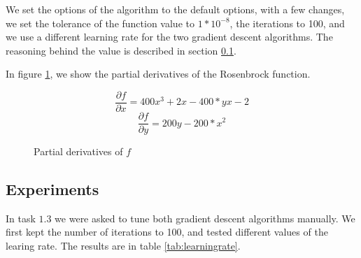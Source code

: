 \documentclass{article}
\begin{document}
We set the options of the algorithm to the default options, with a few changes, we set the tolerance of the function value to $1*10^{-8}$, the iterations to 100, and we use a different learning rate for the two gradient descent algorithms. The reasoning behind the value is described in section \ref{sec:experiments}.

In figure \ref{fig:partdiv}, we show the partial derivatives of the Rosenbrock function.
\begin{figure}[H]
    \[\frac{\partial f}{\partial x} = 400x^3 + 2x - 400*yx - 2\]
    \[\frac{\partial f}{\partial y} = 200y - 200*x^2\]
    \caption{Partial derivatives of $f$}
    \label{fig:partdiv}
\end{figure}



\newpage
\subsection{Experiments}
\label{sec:experiments}
In task $1.3$ we were asked to tune both gradient descent algorithms manually. We first kept the number of iterations to 100, and tested different values of the learing rate. The results are in table \ref{tab:learningrate}.
\end{document}
